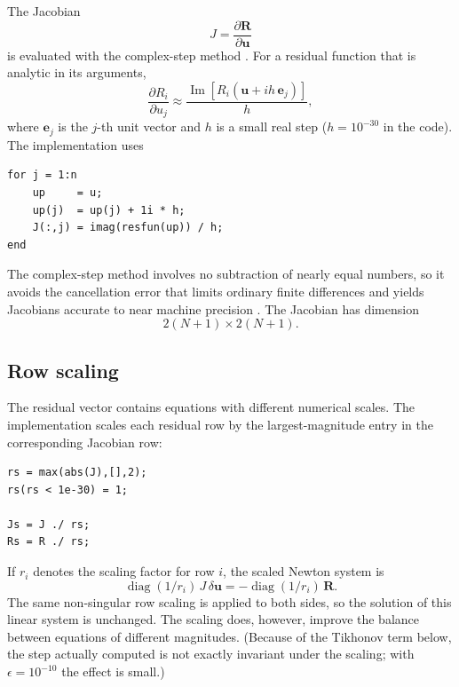 \documentclass[11pt,a4paper]{article}
\begin{document}
The Jacobian
\begin{equation}
J=\frac{\partial\mathbf R}{\partial\mathbf u}
\end{equation}
is evaluated with the complex-step method \cite{squire1998}.
For a residual function that is analytic in its arguments,
\begin{equation}
\frac{\partial R_i}{\partial u_j}
\approx
\frac{
\operatorname{Im}
\left[
R_i(\mathbf u+i h\,\mathbf e_j)
\right]
}{h},
\label{eq:complexstep}
\end{equation}
where $\mathbf e_j$ is the $j$-th unit vector and $h$ is a small real
step ($h=10^{-30}$ in the code). The implementation uses
\begin{lstlisting}[style=matlab]
for j = 1:n
    up     = u;
    up(j)  = up(j) + 1i * h;
    J(:,j) = imag(resfun(up)) / h;
end
\end{lstlisting}
The complex-step method involves no subtraction of nearly equal numbers,
so it avoids the cancellation error that limits ordinary finite
differences and yields Jacobians accurate to near machine precision
\cite{squire1998}. The Jacobian has dimension
\begin{equation}
2(N+1)\times2(N+1).
\end{equation}

\subsection{Row scaling}

The residual vector contains equations with different numerical scales.
The implementation scales each residual row by the largest-magnitude
entry in the corresponding Jacobian row:
\begin{lstlisting}[style=matlab]
rs = max(abs(J),[],2);
rs(rs < 1e-30) = 1;

Js = J ./ rs;
Rs = R ./ rs;
\end{lstlisting}
If $r_i$ denotes the scaling factor for row $i$, the scaled Newton
system is
\begin{equation}
\operatorname{diag}(1/r_i)\,J\,\delta\mathbf u
=
-\operatorname{diag}(1/r_i)\,\mathbf R.
\label{eq:scaled}
\end{equation}
The same non-singular row scaling is applied to both sides, so the
solution of this linear system is unchanged. The scaling does, however,
improve the balance between equations of different magnitudes. (Because
of the Tikhonov term below, the step actually computed is not exactly
invariant under the scaling; with $\epsilon=10^{-10}$ the effect is
small.)
\end{document}
